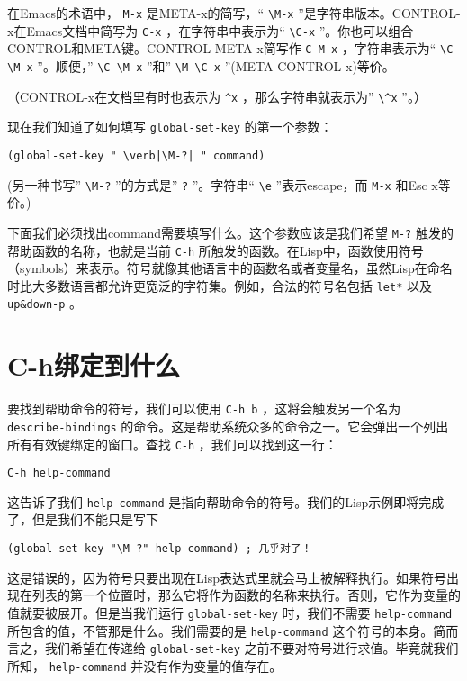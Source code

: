 在Emacs的术语中， \verb|M-x| 是META-x的简写，“ \verb|\M-x| ”是字符串版本。CONTROL-x在Emacs文档中简写为 \verb|C-x| ，在字符串中表示为“ \verb|\C-x| ”。你也可以组合CONTROL和META键。CONTROL-META-x简写作 \verb|C-M-x| ，字符串表示为“ \verb|\C-\M-x| ”。顺便，” \verb|\C-\M-x| ”和” \verb|\M-\C-x| ”(META-CONTROL-x)等价。

（CONTROL-x在文档里有时也表示为 \verb|^x| ，那么字符串就表示为” \verb|\^x| ”。）

现在我们知道了如何填写 \texttt{global-set-key} 的第一个参数：

\begin{verbatim}
(global-set-key " \verb|\M-?| " command)
\end{verbatim}

(另一种书写” \verb|\M-?| ”的方式是” \texttt{\e?} ”。字符串“ \verb|\e| ”表示escape，而 \verb|M-x| 和Esc x等价。)

下面我们必须找出command需要填写什么。这个参数应该是我们希望 \verb|M-?| 触发的帮助函数的名称，也就是当前 \verb|C-h| 所触发的函数。在Lisp中，函数使用符号（symbols）来表示。符号就像其他语言中的函数名或者变量名，虽然Lisp在命名时比大多数语言都允许更宽泛的字符集。例如，合法的符号名包括 \texttt{let*} 以及 \texttt{up&down-p} 。

\section{C-h绑定到什么}
\label{section:01-To-What-Is-C-h-Bound}

要找到帮助命令的符号，我们可以使用 \verb|C-h b| ，这将会触发另一个名为 \texttt{describe-bindings} 的命令。这是帮助系统众多的命令之一。它会弹出一个列出所有有效键绑定的窗口。查找 \verb|C-h| ，我们可以找到这一行：

\begin{verbatim}
C-h help-command
\end{verbatim}

这告诉了我们 \texttt{help-command} 是指向帮助命令的符号。我们的Lisp示例即将完成了，但是我们不能只是写下

\begin{verbatim}
(global-set-key "\M-?" help-command) ; 几乎对了！
\end{verbatim}

这是错误的，因为符号只要出现在Lisp表达式里就会马上被解释执行。如果符号出现在列表的第一个位置时，那么它将作为函数的名称来执行。否则，它作为变量的值就要被展开。但是当我们运行 \texttt{global-set-key} 时，我们不需要 \texttt{help-command} 所包含的值，不管那是什么。我们需要的是 \texttt{help-command} 这个符号的本身。简而言之，我们希望在传递给 \texttt{global-set-key} 之前不要对符号进行求值。毕竟就我们所知， \texttt{help-command} 并没有作为变量的值存在。

